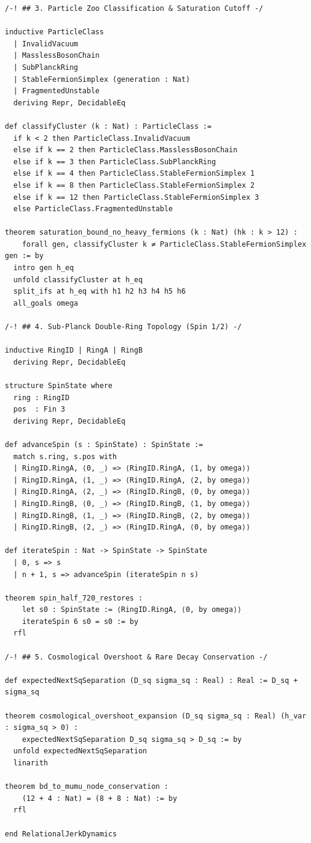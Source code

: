 \documentclass[11pt,a4paper]{article}
\theoremstyle{plain}
\theoremstyle{definition}
\theoremstyle{remark}
\begin{document}
\begin{lstlisting}[caption={Complete, unified Lean 4 module verifying all core theorems of Relational Jerk Dynamics.},label={lst:lean_unified}]
/-! ## 3. Particle Zoo Classification & Saturation Cutoff -/

inductive ParticleClass
  | InvalidVacuum
  | MasslessBosonChain
  | SubPlanckRing
  | StableFermionSimplex (generation : Nat)
  | FragmentedUnstable
  deriving Repr, DecidableEq

def classifyCluster (k : Nat) : ParticleClass :=
  if k < 2 then ParticleClass.InvalidVacuum
  else if k == 2 then ParticleClass.MasslessBosonChain
  else if k == 3 then ParticleClass.SubPlanckRing
  else if k == 4 then ParticleClass.StableFermionSimplex 1
  else if k == 8 then ParticleClass.StableFermionSimplex 2
  else if k == 12 then ParticleClass.StableFermionSimplex 3
  else ParticleClass.FragmentedUnstable

theorem saturation_bound_no_heavy_fermions (k : Nat) (hk : k > 12) :
    forall gen, classifyCluster k ≠ ParticleClass.StableFermionSimplex gen := by
  intro gen h_eq
  unfold classifyCluster at h_eq
  split_ifs at h_eq with h1 h2 h3 h4 h5 h6
  all_goals omega

/-! ## 4. Sub-Planck Double-Ring Topology (Spin 1/2) -/

inductive RingID | RingA | RingB
  deriving Repr, DecidableEq

structure SpinState where
  ring : RingID
  pos  : Fin 3
  deriving Repr, DecidableEq

def advanceSpin (s : SpinState) : SpinState :=
  match s.ring, s.pos with
  | RingID.RingA, ⟨0, _⟩ => ⟨RingID.RingA, ⟨1, by omega⟩⟩
  | RingID.RingA, ⟨1, _⟩ => ⟨RingID.RingA, ⟨2, by omega⟩⟩
  | RingID.RingA, ⟨2, _⟩ => ⟨RingID.RingB, ⟨0, by omega⟩⟩
  | RingID.RingB, ⟨0, _⟩ => ⟨RingID.RingB, ⟨1, by omega⟩⟩
  | RingID.RingB, ⟨1, _⟩ => ⟨RingID.RingB, ⟨2, by omega⟩⟩
  | RingID.RingB, ⟨2, _⟩ => ⟨RingID.RingA, ⟨0, by omega⟩⟩

def iterateSpin : Nat -> SpinState -> SpinState
  | 0, s => s
  | n + 1, s => advanceSpin (iterateSpin n s)

theorem spin_half_720_restores :
    let s0 : SpinState := ⟨RingID.RingA, ⟨0, by omega⟩⟩
    iterateSpin 6 s0 = s0 := by
  rfl

/-! ## 5. Cosmological Overshoot & Rare Decay Conservation -/

def expectedNextSqSeparation (D_sq sigma_sq : Real) : Real := D_sq + sigma_sq

theorem cosmological_overshoot_expansion (D_sq sigma_sq : Real) (h_var : sigma_sq > 0) :
    expectedNextSqSeparation D_sq sigma_sq > D_sq := by
  unfold expectedNextSqSeparation
  linarith

theorem bd_to_mumu_node_conservation :
    (12 + 4 : Nat) = (8 + 8 : Nat) := by
  rfl

end RelationalJerkDynamics
\end{lstlisting}
\end{document}
